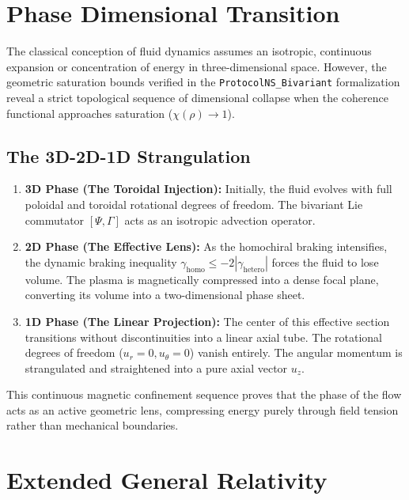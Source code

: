 
\section{Phase Dimensional Transition}
\label{part-2:sec:phase-transition}

The classical conception of fluid dynamics assumes an isotropic, continuous expansion or concentration of energy in three-dimensional space. However, the geometric saturation bounds verified in the \texttt{ProtocolNS\_Bivariant} formalization reveal a strict topological sequence of dimensional collapse when the coherence functional approaches saturation ($\chi(\rho) \to 1$).

\subsection{The 3D-2D-1D Strangulation}

\begin{enumerate}
    \item \textbf{3D Phase (The Toroidal Injection):} Initially, the fluid evolves with full poloidal and toroidal rotational degrees of freedom. The bivariant Lie commutator $[\Psi, \Gamma]$ acts as an isotropic advection operator.
    \item \textbf{2D Phase (The Effective Lens):} As the homochiral braking intensifies, the dynamic braking inequality $\gamma_{\text{homo}} \leq -2|\gamma_{\text{hetero}}|$ forces the fluid to lose volume. The plasma is magnetically compressed into a dense focal plane, converting its volume into a two-dimensional phase sheet.
    \item \textbf{1D Phase (The Linear Projection):} The center of this effective section transitions without discontinuities into a linear axial tube. The rotational degrees of freedom ($u_r = 0, u_\theta = 0$) vanish entirely. The angular momentum is strangulated and straightened into a pure axial vector $u_z$.
\end{enumerate}

This continuous magnetic confinement sequence proves that the phase of the flow acts as an active geometric lens, compressing energy purely through field tension rather than mechanical boundaries.

\section{Extended General Relativity}
\label{part-2:sec:extended-gr}

